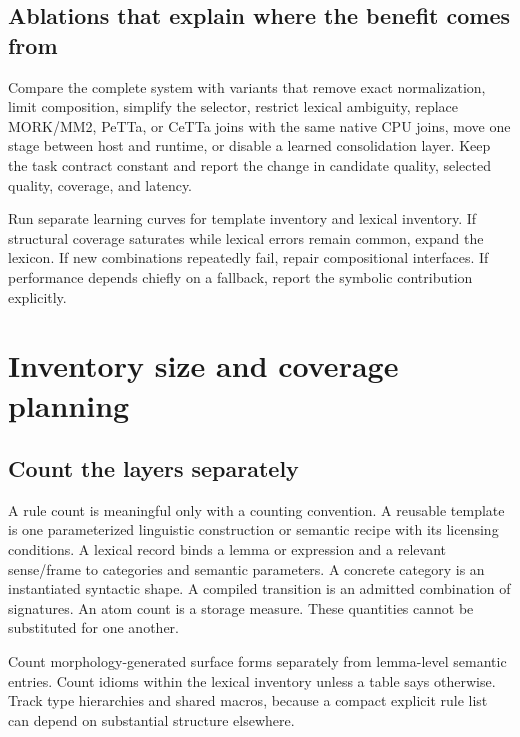 \documentclass[11pt,a4paper]{article}
\begin{document}
\subsection{Ablations that explain where the benefit comes from}
Compare the complete system with variants that remove exact normalization,
limit composition, simplify the selector, restrict lexical ambiguity, replace
MORK/MM2, PeTTa, or CeTTa joins with the same native CPU joins, move
one stage between host and runtime, or disable a learned consolidation layer.
Keep the task contract constant and report the change in candidate quality,
selected quality, coverage, and latency.

Run separate learning curves for template inventory and lexical inventory.
If structural coverage saturates while lexical errors remain common, expand
the lexicon. If new combinations repeatedly fail, repair compositional
interfaces. If performance depends chiefly on a fallback, report the
symbolic contribution explicitly.

\section{Inventory size and coverage planning}\label{sec:size}

\subsection{Count the layers separately}
A rule count is meaningful only with a counting convention.
A reusable template is one parameterized linguistic construction or semantic
recipe with its licensing conditions. A lexical record binds a lemma or
expression and a relevant sense/frame to categories and semantic parameters.
A concrete category is an instantiated syntactic shape. A compiled transition
is an admitted combination of signatures. An atom count is a storage measure.
These quantities cannot be substituted for one another.

Count morphology-generated surface forms separately from lemma-level
semantic entries. Count idioms within the lexical inventory unless a table
says otherwise. Track type hierarchies and shared macros, because a compact
explicit rule list can depend on substantial structure elsewhere.
\end{document}

